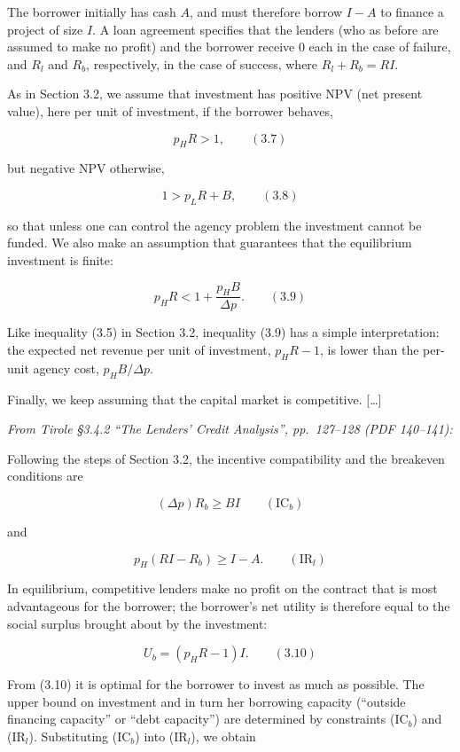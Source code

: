 \documentclass[11pt,a4paper]{article}
\begin{document}
The borrower initially has cash \(A\), and must therefore borrow \(I - A\) to finance a project of
size \(I\). A loan agreement specifies that the lenders (who as before are assumed to make no
profit) and the borrower receive 0 each in the case of failure, and \(R_l\) and \(R_b\),
respectively, in the case of success, where \(R_l + R_b = RI\).

As in Section 3.2, we assume that investment has positive NPV (net present value), here per unit of
investment, if the borrower behaves,

\[p_H R > 1, \qquad (3.7)\]

but negative NPV otherwise,

\[1 > p_L R + B, \qquad (3.8)\]

so that unless one can control the agency problem the investment cannot be funded. We also make an
assumption that guarantees that the equilibrium investment is finite:

\[p_H R < 1 + \frac{p_H B}{\Delta p}. \qquad (3.9)\]

Like inequality (3.5) in Section 3.2, inequality (3.9) has a simple interpretation: the expected net
revenue per unit of investment, \(p_H R - 1\), is lower than the per-unit agency cost,
\(p_H B/\Delta p\).

Finally, we keep assuming that the capital market is competitive. {[}\ldots{]}

\emph{From Tirole §3.4.2 ``The Lenders' Credit Analysis'', pp.~127--128 (PDF 140--141):}

Following the steps of Section 3.2, the incentive compatibility and the breakeven conditions are

\[(\Delta p) R_b \geqslant BI \qquad (\text{IC}_b)\]

and

\[p_H(RI - R_b) \geqslant I - A. \qquad (\text{IR}_l)\]

In equilibrium, competitive lenders make no profit on the contract that is most advantageous for the
borrower; the borrower's net utility is therefore equal to the social surplus brought about by the
investment:

\[U_b = (p_H R - 1) I. \qquad (3.10)\]

From (3.10) it is optimal for the borrower to invest as much as possible. The upper bound on
investment and in turn her borrowing capacity (``outside financing capacity'' or ``debt capacity'')
are determined by constraints (IC\(_b\)) and (IR\(_l\)). Substituting (IC\(_b\)) into (IR\(_l\)), we
obtain
\end{document}
